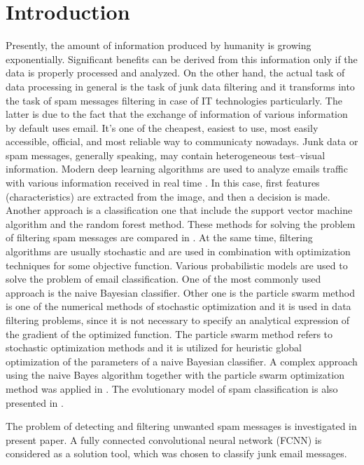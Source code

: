 \documentclass[12pt]{jpconf}
\begin{document}
\section{Introduction}
Presently, the amount of information produced by humanity
is growing exponentially. Significant benefits can be derived from this information only if the data is properly processed and analyzed.
On the other hand, the actual task of data processing in general is the task of junk data filtering and it transforms into the task of spam messages filtering in case of IT technologies particularly.
The latter is due to the fact that the exchange of information of various information by default uses email. It's one of the cheapest, easiest to use, most easily accessible, official, and most reliable way to communicaty nowadays.
Junk data or spam messages, generally speaking, may contain heterogeneous test--visual information. Modern deep
learning algorithms are used to analyze emails traffic with various information received in real time \cite{Makkar2021}.
In this case, first features (characteristics) are extracted from the image, and then a decision is made.
Another approach is a classification one that include the support vector machine algorithm and the random forest method. These methods for solving the problem of filtering spam messages are compared in \cite{Taylor2020}.
At the same time, filtering algorithms are usually stochastic \cite{Garg2021} and are used in combination with optimization techniques for some objective function. Various probabilistic models are used to solve the problem of email classification. One of the most commonly used approach is the naive Bayesian classifier. Other one is the particle swarm method is one of the numerical methods of stochastic optimization and it is used in data filtering problems, since it is not necessary to specify an analytical expression of the gradient of the optimized function. The particle swarm method refers to stochastic optimization methods and it is utilized for heuristic global optimization of the parameters of a naive Bayesian classifier. A complex approach using the naive Bayes algorithm together with the particle swarm optimization method was applied in \cite{Parmar2020}.
The evolutionary model of spam classification is also presented in \cite{Mohammad2020}.

The problem of detecting and filtering unwanted spam messages is investigated in present paper. A fully connected convolutional neural network (\textsf{FCNN}) is considered as a solution tool, which was chosen to classify junk email messages.
\end{document}
